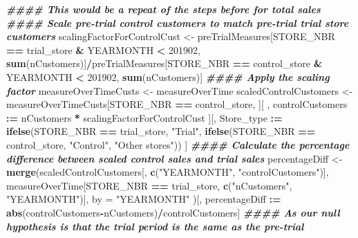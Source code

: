 \documentclass[
]{article}
\newenvironment{Shaded}{\begin{snugshade}}{\end{snugshade}}
\newcommand{\AttributeTok}[1]{\textcolor[rgb]{0.13,0.29,0.53}{#1}}
\newcommand{\DecValTok}[1]{\textcolor[rgb]{0.00,0.00,0.81}{#1}}
\newcommand{\DocumentationTok}[1]{\textcolor[rgb]{0.56,0.35,0.01}{\textbf{\textit{#1}}}}
\newcommand{\FunctionTok}[1]{\textcolor[rgb]{0.13,0.29,0.53}{\textbf{#1}}}
\newcommand{\NormalTok}[1]{#1}
\newcommand{\OtherTok}[1]{\textcolor[rgb]{0.56,0.35,0.01}{#1}}
\newcommand{\SpecialCharTok}[1]{\textcolor[rgb]{0.81,0.36,0.00}{\textbf{#1}}}
\newcommand{\StringTok}[1]{\textcolor[rgb]{0.31,0.60,0.02}{#1}}
\begin{document}
\begin{Shaded}
\begin{Highlighting}[]
\DocumentationTok{\#\#\#\# This would be a repeat of the steps before for total sales}
\DocumentationTok{\#\#\#\# Scale pre{-}trial control customers to match pre{-}trial trial store customers}
\NormalTok{scalingFactorForControlCust }\OtherTok{\textless{}{-}}\NormalTok{ preTrialMeasures[STORE\_NBR }\SpecialCharTok{==}\NormalTok{ trial\_store }\SpecialCharTok{\&}
\NormalTok{YEARMONTH }\SpecialCharTok{\textless{}} \DecValTok{201902}\NormalTok{, }\FunctionTok{sum}\NormalTok{(nCustomers)]}\SpecialCharTok{/}\NormalTok{preTrialMeasures[STORE\_NBR }\SpecialCharTok{==}\NormalTok{ control\_store }\SpecialCharTok{\&}
\NormalTok{YEARMONTH }\SpecialCharTok{\textless{}} \DecValTok{201902}\NormalTok{, }\FunctionTok{sum}\NormalTok{(nCustomers)]}
\DocumentationTok{\#\#\#\# Apply the scaling factor}
\NormalTok{measureOverTimeCusts }\OtherTok{\textless{}{-}}\NormalTok{ measureOverTime}
\NormalTok{scaledControlCustomers }\OtherTok{\textless{}{-}}\NormalTok{ measureOverTimeCusts[STORE\_NBR }\SpecialCharTok{==}\NormalTok{ control\_store,}
\NormalTok{                                            ][ , controlCustomers }\SpecialCharTok{:=}\NormalTok{ nCustomers}
\SpecialCharTok{*}\NormalTok{ scalingFactorForControlCust}
\NormalTok{                                            ][, Store\_type }\SpecialCharTok{:=} \FunctionTok{ifelse}\NormalTok{(STORE\_NBR}
\SpecialCharTok{==}\NormalTok{ trial\_store, }\StringTok{"Trial"}\NormalTok{,}
                                      \FunctionTok{ifelse}\NormalTok{(STORE\_NBR }\SpecialCharTok{==}\NormalTok{ control\_store,}
\StringTok{"Control"}\NormalTok{, }\StringTok{"Other stores"}\NormalTok{))}
\NormalTok{]}
\DocumentationTok{\#\#\#\# Calculate the percentage difference between scaled control sales and trial sales}
\NormalTok{percentageDiff }\OtherTok{\textless{}{-}} \FunctionTok{merge}\NormalTok{(scaledControlCustomers[, }\FunctionTok{c}\NormalTok{(}\StringTok{"YEARMONTH"}\NormalTok{,}
\StringTok{"controlCustomers"}\NormalTok{)],}
\NormalTok{                        measureOverTime[STORE\_NBR }\SpecialCharTok{==}\NormalTok{ trial\_store, }\FunctionTok{c}\NormalTok{(}\StringTok{"nCustomers"}\NormalTok{,}
\StringTok{"YEARMONTH"}\NormalTok{)],}
                        \AttributeTok{by =} \StringTok{"YEARMONTH"}
\NormalTok{                        )[, percentageDiff }\SpecialCharTok{:=}
\FunctionTok{abs}\NormalTok{(controlCustomers}\SpecialCharTok{{-}}\NormalTok{nCustomers)}\SpecialCharTok{/}\NormalTok{controlCustomers]}
\DocumentationTok{\#\#\#\# As our null hypothesis is that the trial period is the same as the pre{-}trial }

\end{Highlighting}
\end{Shaded}
\end{document}
